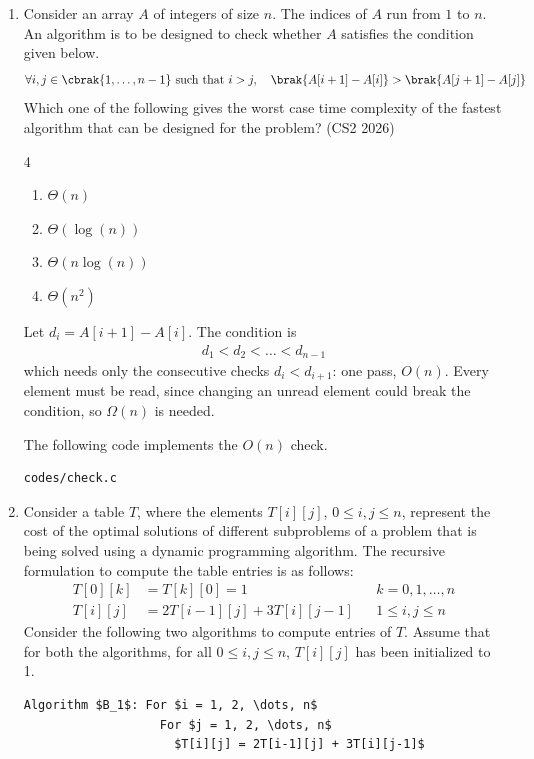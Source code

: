 \begin{enumerate}[label=\thesubsection.\arabic*, ref=\thesubsection.\theenumi]
\item Consider an array $A$ of integers of size $n$. The indices of $A$ run
from $1$ to $n$. An algorithm is to be designed to check whether $A$
satisfies the condition given below.
\begin{align*}
\forall i, j \in \cbrak{1, \dots, n-1} \text{ such that } i > j, \quad
\brak{A[i+1] - A[i]} > \brak{A[j+1] - A[j]}
\end{align*}
Which one of the following gives the worst case time complexity of the
fastest algorithm that can be designed for the problem?
\hfill (CS2 2026)
\begin{multicols}{4}
\begin{enumerate}[label=\roman*)]
  \item $\Theta(n)$
  \item $\Theta(\log(n))$
  \item $\Theta(n\log(n))$
  \item $\Theta(n^2)$
\end{enumerate}
\end{multicols}
\solution Let $d_i = A[i+1] - A[i]$. The condition is
\begin{align}
d_1 < d_2 < \dots < d_{n-1}
\end{align}
which needs only the consecutive checks $d_i < d_{i+1}$: one pass, $O(n)$.
Every element must be read, since changing an unread element could break
the condition, so $\Omega(n)$ is needed.

The following code implements the $O(n)$ check.
\begin{lstlisting}
codes/check.c
\end{lstlisting}

\item Consider a table $T$, where the elements $T[i][j]$,
$0 \le i, j \le n$, represent the cost of the optimal solutions of
different subproblems of a problem that is being solved using a dynamic
programming algorithm. The recursive formulation to compute the table
entries is as follows:
\begin{align}
T[0][k] &= T[k][0] = 1 && k = 0, 1, \dots, n \\
T[i][j] &= 2T[i-1][j] + 3T[i][j-1] && 1 \le i, j \le n
\label{eq:q39-rec}
\end{align}
Consider the following two algorithms to compute entries of $T$. Assume
that for both the algorithms, for all $0 \le i, j \le n$, $T[i][j]$ has
been initialized to 1.
\par\medskip\noindent\begin{minipage}{\linewidth}
\begin{lstlisting}[mathescape=true]
Algorithm $B_1$: For $i = 1, 2, \dots, n$
                   For $j = 1, 2, \dots, n$
                     $T[i][j] = 2T[i-1][j] + 3T[i][j-1]$


\end{lstlisting}
\end{minipage}
\end{enumerate}

